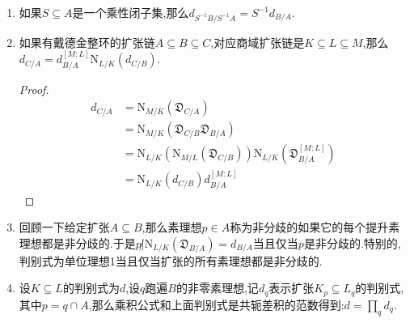 \begin{enumerate}
\begin{proof}
		但是这里$(\mathrm{N}_{L/K}(\beta))=\mathrm{N}_{L/K}(\mathfrak{C}_{B/A})=\mathrm{N}_{L/K}(\mathfrak{D}_{L/K})^{-1}$.另外$d(\alpha_1,\cdots,\alpha_n)=\det(\sigma_i\alpha_j)^2$和$d(\alpha_1^v,\cdots,\alpha_n^v)=\det(\sigma_i\alpha_j^v)^2$结合$\mathrm{T}(\alpha_i\alpha_j^v)=\delta_{ij}$说明$d(\alpha_1,\cdots,\alpha_n)d(\alpha_1^v,\cdots,\alpha_n^v)=1$,于是有:
		\begin{align*}
			d_{L/K}^{-1}&=d(\alpha_1,\cdots,\alpha_n)^{-1}=d(\alpha_1^v,\cdots,\alpha_n^v)=(d(\beta\alpha_i))\\&=\mathrm{N}_{L/K}(\mathfrak{D}_{L/K})^{-2}d_{L/K}
		\end{align*}
		
		另外如果借助格的语言证明更简单:我们在格上双线性型的判别式中证明过有$d_{B/A}=\chi_A(B^*/B)$.也证明过$B^*\chi_B(B^*/B)=B^*\chi_B(B^*,B)=B$于是有$\chi_B(B^*/B)=\mathfrak{D}_{B/A}$.最后只要注意的,如果$B$模$M$是有限长度的,那么有$\chi_A(M)=\mathrm{N}(\chi_B(M))$,取$M=B^*/B$得到结论.
	\end{proof}
	\item 如果$S\subseteq A$是一个乘性闭子集,那么$d_{S^{-1}B/S^{-1}A}=S^{-1}d_{B/A}$.
    \item 如果有戴德金整环的扩张链$A\subseteq B\subseteq C$,对应商域扩张链是$K\subseteq L\subseteq M$,那么$d_{C/A}=d_{B/A}^{[M:L]}\mathrm{N}_{L/K}(d_{C/B})$.
    \begin{proof}
    	\begin{align*}
    	d_{C/A}&=\mathrm{N}_{M/K}(\mathfrak{D}_{C/A})\\&=\mathrm{N}_{M/K}(\mathfrak{D}_{C/B}\mathfrak{D}_{B/A})\\&=\mathrm{N}_{L/K}(\mathrm{N}_{M/L}(\mathfrak{D}_{C/B}))\mathrm{N}_{L/K}(\mathfrak{D}_{B/A}^{[M:L]})\\&=\mathrm{N}_{L/K}(d_{C/B})d_{B/A}^{[M:L]}
    	\end{align*}
    \end{proof}
    \item 回顾一下给定扩张$A\subseteq B$,那么素理想$p\in A$称为非分歧的如果它的每个提升素理想都是非分歧的.于是$p\not|\mathrm{N}_{L/K}(\mathfrak{D}_{B/A})=d_{B/A}$当且仅当$p$是非分歧的.特别的,判别式为单位理想1当且仅当扩张的所有素理想都是非分歧的.
    \item 设$K\subseteq L$的判别式为$d$,设$q$跑遍$B$的非零素理想,记$d_q$表示扩张$K_p\subseteq L_q$的判别式,其中$p=q\cap A$,那么乘积公式和上面判别式是共轭差积的范数得到:$d=\prod_qd_q$.
\end{enumerate}

